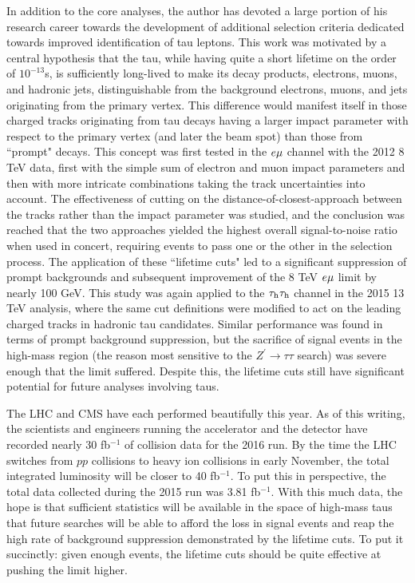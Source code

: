 In addition to the core analyses, the author has devoted a large portion of his research career towards the development of additional selection criteria dedicated towards improved identification of tau leptons. This work was motivated by a central hypothesis that the tau, while having quite a short lifetime on the order of $10^{-13}$s, is sufficiently long-lived to make its decay products, electrons, muons, and hadronic jets, distinguishable from the background electrons, muons, and jets originating from the primary vertex. This difference would manifest itself in those charged tracks originating from tau decays having a larger impact parameter with respect to the primary vertex (and later the beam spot) than those from ``prompt" decays. This concept was first tested in the $e\mu$ channel with the 2012 8 TeV data, first with the simple sum of electron and muon impact parameters and then with more intricate combinations taking the track uncertainties into account. The effectiveness of cutting on the distance-of-closest-approach between the tracks rather than the impact parameter was studied, and the conclusion was reached that the two approaches yielded the highest overall signal-to-noise ratio when used in concert, requiring events to pass one or the other in the selection process. The application of these ``lifetime cuts" led to a significant suppression of prompt backgrounds and subsequent improvement of the 8 TeV $e\mu$ limit by nearly 100 GeV. This study was again applied to the $\tau_{\textrm{h}}\tau_{\textrm{h}}$ channel in the 2015 13 TeV analysis, where the same cut definitions were modified to act on the leading charged tracks in hadronic tau candidates. Similar performance was found in terms of prompt background suppression, but the sacrifice of signal events in the high-mass region (the reason most sensitive to the $Z^\prime\to\tau\tau$ search) was severe enough that the limit suffered. Despite this, the lifetime cuts still have significant potential for future analyses involving taus.

The LHC and CMS have each performed beautifully this year. As of this writing, the scientists and engineers running the accelerator and the detector have recorded nearly 30 fb$^{-1}$ of collision data for the 2016 run. By the time the LHC switches from $pp$ collisions to heavy ion collisions in early November, the total integrated luminosity will be closer to 40 fb$^{-1}$\cite{CMSLumi}. To put this in perspective, the total data collected during the 2015 run was 3.81 fb$^{-1}$. With this much data, the hope is that sufficient statistics will be available in the space of high-mass taus that future searches will be able to afford the loss in signal events and reap the high rate of background suppression demonstrated by the lifetime cuts. To put it succinctly: given enough events, the lifetime cuts should be quite effective at pushing the limit higher.


